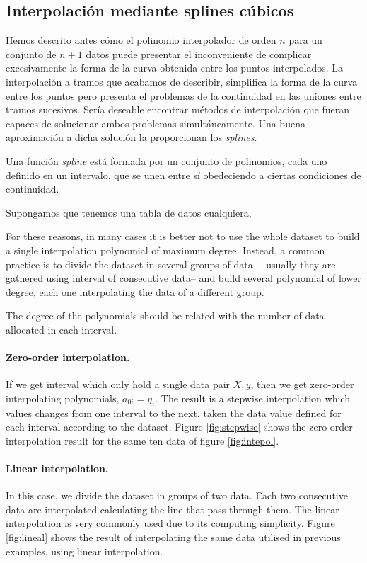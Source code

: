 \begin{paracol}{2}
\subsection{Interpolación mediante splines cúbicos} 
Hemos descrito antes cómo el polinomio interpolador de orden $n$ para un conjunto de $n+1$ datos puede presentar el inconveniente de complicar excesivamente la forma de  la curva obtenida entre los puntos interpolados. La interpolación a tramos que acabamos de describir, simplifica la forma de la curva entre los puntos pero presenta el problemas de la continuidad en las uniones entre tramos sucesivos. Sería deseable encontrar métodos de interpolación que fueran capaces de solucionar ambos problemas simultáneamente. Una buena aproximación a dicha solución la proporcionan los \emph{splines}.

Una función \emph{spline} está formada por un conjunto de polinomios, cada uno definido en un intervalo, que se unen entre sí obedeciendo a ciertas condiciones de continuidad.

Supongamos que tenemos una tabla de datos cualquiera,

\switchcolumn
For these reasons, in many cases it is better not to use the whole dataset to build a single interpolation polynomial of maximum degree. Instead, a common practice is to divide the dataset in several groups of data ---usually they are gathered using interval of consecutive data-- and build several polynomial of lower degree, each one interpolating the data of  a different group.

The  degree of the polynomials should be related with the number of data allocated in each interval.

\paragraph{Zero-order interpolation.}  If we get interval which only hold a single  data pair $X,y$, then we get zero-order interpolating polynomials, $a_{0i} = y_i$. The result is a stepwise interpolation which values changes from one interval to the next,  taken the data value defined for each interval according to the dataset.   Figure \ref{fig:stepwise} shows the zero-order interpolation result for the same ten data of figure \ref{fig:intepol}. 

\paragraph{Linear interpolation.}  In this case, we divide the dataset in groups of two data. Each two consecutive data are interpolated calculating the line that pass through them. The linear interpolation is very commonly used due to its computing simplicity. Figure \ref{fig:lineal} shows the result of interpolating the same data utilised in previous examples, using linear interpolation. 


\end{paracol}
